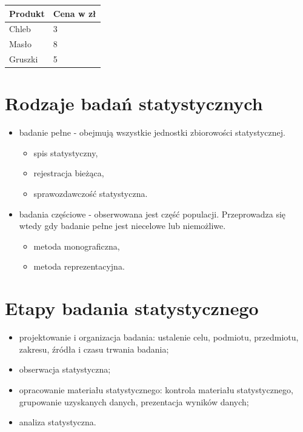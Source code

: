 \documentclass[
  polish,
  letterpaper,
  DIV=11,
  numbers=noendperiod]{scrreprt}
\newcounter{none} %
\providecommand{\tightlist}{%
  \setlength{\itemsep}{0pt}\setlength{\parskip}{0pt}}
\begin{document}
{\def\LTcaptype{none} %
\begin{longtable}[]{@{}ll@{}}
\toprule\noalign{}
Produkt & Cena w zł \\
\midrule\noalign{}
\endhead
\bottomrule\noalign{}
\endlastfoot
Chleb & 3 \\
Masło & 8 \\
Gruszki & 5 \\
\end{longtable}
}

\section{Rodzaje badań
statystycznych}\label{rodzaje-badaux144-statystycznych}

\begin{itemize}
\tightlist
\item
  badanie pełne - obejmują wszystkie jednostki zbiorowości
  statystycznej.

  \begin{itemize}
  \tightlist
  \item
    spis statystyczny,
  \item
    rejestracja bieżąca,
  \item
    sprawozdawczość statystyczna.
  \end{itemize}
\item
  badania częściowe - obserwowana jest część populacji. Przeprowadza się
  wtedy gdy badanie pełne jest niecelowe lub niemożliwe.

  \begin{itemize}
  \tightlist
  \item
    metoda monograficzna,
  \item
    metoda reprezentacyjna.
  \end{itemize}
\end{itemize}

\section{Etapy badania
statystycznego}\label{etapy-badania-statystycznego}

\begin{itemize}
\tightlist
\item
  projektowanie i organizacja badania: ustalenie celu, podmiotu,
  przedmiotu, zakresu, źródła i czasu trwania badania;
\item
  obserwacja statystyczna;
\item
  opracowanie materiału statystycznego: kontrola materiału
  statystycznego, grupowanie uzyskanych danych, prezentacja wyników
  danych;
\item
  analiza statystyczna.
\end{itemize}
\end{document}
